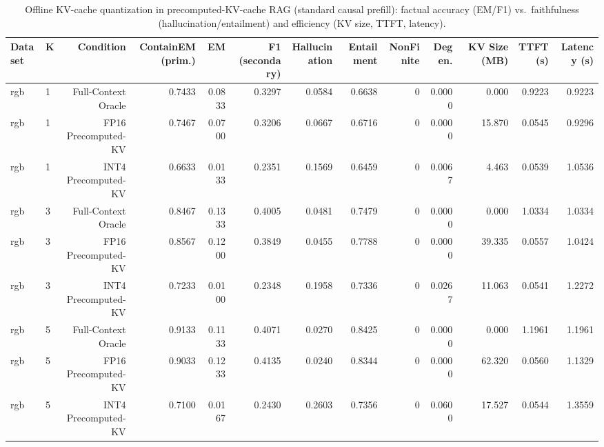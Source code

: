 \begin{table}[t]
\centering
\small
\begin{tabular}{llrrrrrrrrrrr}
\toprule
Dataset & K & Condition & ContainEM (prim.) & EM & F1 (secondary) & Hallucination & Entailment & NonFinite & Degen. & KV Size (MB) & TTFT (s) & Latency (s) \\
\midrule
rgb & 1 & Full-Context Oracle & 0.7433 & 0.0833 & 0.3297 & 0.0584 & 0.6638 & 0 & 0.0000 & 0.000 & 0.9223 & 0.9223 \\
rgb & 1 & FP16 Precomputed-KV & 0.7467 & 0.0700 & 0.3206 & 0.0667 & 0.6716 & 0 & 0.0000 & 15.870 & 0.0545 & 0.9296 \\
rgb & 1 & INT4 Precomputed-KV & 0.6633 & 0.0133 & 0.2351 & 0.1569 & 0.6459 & 0 & 0.0067 & 4.463 & 0.0539 & 1.0536 \\
rgb & 3 & Full-Context Oracle & 0.8467 & 0.1333 & 0.4005 & 0.0481 & 0.7479 & 0 & 0.0000 & 0.000 & 1.0334 & 1.0334 \\
rgb & 3 & FP16 Precomputed-KV & 0.8567 & 0.1200 & 0.3849 & 0.0455 & 0.7788 & 0 & 0.0000 & 39.335 & 0.0557 & 1.0424 \\
rgb & 3 & INT4 Precomputed-KV & 0.7233 & 0.0100 & 0.2348 & 0.1958 & 0.7336 & 0 & 0.0267 & 11.063 & 0.0541 & 1.2272 \\
rgb & 5 & Full-Context Oracle & 0.9133 & 0.1133 & 0.4071 & 0.0270 & 0.8425 & 0 & 0.0000 & 0.000 & 1.1961 & 1.1961 \\
rgb & 5 & FP16 Precomputed-KV & 0.9033 & 0.1233 & 0.4135 & 0.0240 & 0.8344 & 0 & 0.0000 & 62.320 & 0.0560 & 1.1329 \\
rgb & 5 & INT4 Precomputed-KV & 0.7100 & 0.0167 & 0.2430 & 0.2603 & 0.7356 & 0 & 0.0600 & 17.527 & 0.0544 & 1.3559 \\
\bottomrule
\end{tabular}
\caption{Offline KV-cache quantization in precomputed-KV-cache RAG (standard causal prefill): factual accuracy (EM/F1) vs.\ faithfulness (hallucination/entailment) and efficiency (KV size, TTFT, latency).}
\label{tab:main}
\end{table}
